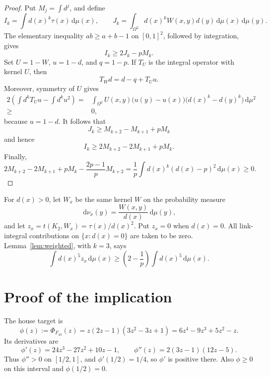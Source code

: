 \documentclass[11pt]{article}
\newcommand{\dd}{\,\mathrm d}
\begin{document}
\begin{proof}
Put $M_j=\int d^j$, and define
\[
 I_k=\int d(x)^k\tau(x)\dd\mu(x),
 \qquad
 J_k=\int_{\Omega^2}d(x)^kW(x,y)d(y)
       \dd\mu(x)\dd\mu(y).
\]
The elementary inequality $ab\geq a+b-1$ on $[0,1]^2$, followed by
integration, gives
\[
 I_k\geq 2J_k-pM_k.
\]
Set $U=1-W$, $u=1-d$, and $q=1-p$.  If $T_U$ is the integral operator
with kernel $U$, then
\[
 T_Wd=d-q+T_Uu.
\]
Moreover, symmetry of $U$ gives
\[
\begin{split}
 2\left(\int d^kT_Uu-\int d^ku^2\right)
 ={}&\int_{\Omega^2}U(x,y)
       \bigl(u(y)-u(x)\bigr)
       \bigl(d(x)^k-d(y)^k\bigr)\dd\mu^2\\
 \geq{}&0,
\end{split}
\]
because $u=1-d$.  It follows that
\[
 J_k\geq M_{k+2}-M_{k+1}+pM_k
\]
and hence
\[
 I_k\geq2M_{k+2}-2M_{k+1}+pM_k.
\]
Finally,
\[
 2M_{k+2}-2M_{k+1}+pM_k
 -\frac{2p-1}{p}M_{k+2}
 =\frac1p\int d(x)^k(d(x)-p)^2\dd\mu(x)\geq0.
\]
\end{proof}

For $d(x)>0$, let $W_x$ be the same kernel $W$ on the probability measure
\[
 \dd\nu_x(y)=\frac{W(x,y)}{d(x)}\dd\mu(y),
\]
and let $z_x=t(K_2,W_x)=\tau(x)/d(x)^2$.  Put $z_x=0$ when $d(x)=0$.
All link-integral contributions on $\{x:d(x)=0\}$ are taken to be zero.
Lemma~\ref{lem:weighted}, with $k=3$, says
\begin{equation}
 \label{eq:link-average}
 \int d(x)^5z_x\dd\mu(x)
 \geq \left(2-\frac1p\right)\int d(x)^5\dd\mu(x).
\end{equation}

\section{Proof of the implication}

The house target is
\[
 \phi(z):=\Phi_{F_{43}}(z)
 =z(2z-1)(3z^2-3z+1)
 =6z^4-9z^3+5z^2-z.
\]
Its derivatives are
\[
 \phi'(z)=24z^3-27z^2+10z-1,
 \qquad
 \phi''(z)=2(3z-1)(12z-5).
\]
Thus $\phi''>0$ on $[1/2,1]$, and
$\phi'(1/2)=1/4$, so $\phi'$ is positive there.  Also
$\phi\geq0$ on this interval and $\phi(1/2)=0$.
\end{document}
